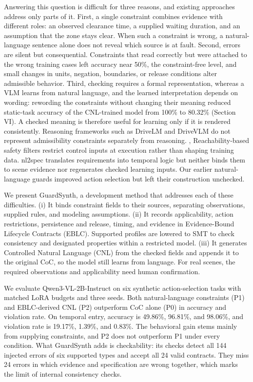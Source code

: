 \documentclass[nolineno]{ieeeaccess}
\begin{document}
Answering this question is difficult for three reasons, and existing approaches address only parts of it. First, a single constraint combines evidence with different roles: an observed clearance time, a supplied waiting duration, and an assumption that the zone stays clear. When such a constraint is wrong, a natural-language sentence alone does not reveal which source is at fault. Second, errors are silent but consequential. Constraints that read correctly but were attached to the wrong training cases left accuracy near 50\%, the constraint-free level, and small changes in units, negation, boundaries, or release conditions alter admissible behavior. Third, checking requires a formal representation, whereas a VLM learns from natural language, and the learned interpretation depends on wording: rewording the constraints without changing their meaning reduced static-task accuracy of the CNL-trained model from 100\% to 80.32\% (Section VI). A checked meaning is therefore useful for learning only if it is rendered consistently. Reasoning frameworks such as DriveLM and DriveVLM do not represent admissibility constraints separately from reasoning. \cite{r2}, \cite{r3} Reachability-based safety filters restrict control inputs at execution rather than shaping training data. \cite{r19} nl2spec translates requirements into temporal logic but neither binds them to scene evidence nor regenerates checked learning inputs. \cite{r9} Our earlier natural-language guards improved action selection but left their construction unchecked. \cite{r4}\par

We present GuardSynth, a development method that addresses each of these difficulties. (i) It binds constraint fields to their sources, separating observations, supplied rules, and modeling assumptions. (ii) It records applicability, action restrictions, persistence and release, timing, and evidence in Evidence-Bound Lifecycle Contracts (EBLC). Supported profiles are lowered to SMT to check consistency and designated properties within a restricted model. (iii) It generates Controlled Natural Language (CNL) from the checked fields and appends it to the original CoC, so the model still learns from language. For real scenes, the required observations and applicability need human confirmation.\par

We evaluate Qwen3-VL-2B-Instruct on six synthetic action-selection tasks with matched LoRA budgets and three seeds. Both natural-language constraints (P1) and EBLC-derived CNL (P2) outperform CoC alone (P0) in accuracy and violation rate. On temporal entry, accuracy is 49.86\%, 96.81\%, and 98.06\%, and violation rate is 19.17\%, 1.39\%, and 0.83\%. The behavioral gain stems mainly from supplying constraints, and P2 does not outperform P1 under every condition. What GuardSynth adds is checkability: its checks detect all 144 injected errors of six supported types and accept all 24 valid contracts. They miss 24 errors in which evidence and specification are wrong together, which marks the limit of internal consistency checks.\par
\end{document}
